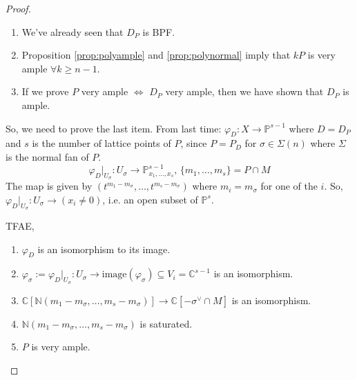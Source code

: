 \documentclass[a4paper,12pt]{amsart}
\begin{document}
\begin{proof}
\begin{enumerate}
	\item We've already seen that $D_P$ is BPF.
	\item Proposition \ref{prop:polyample} and \ref{prop:polynormal} imply that $kP$ is very ample $\forall k \geq n-1$.
	\item If we prove $P$ very ample $\Leftrightarrow$ $D_P$ very ample, then we have shown that $D_P$ is ample. 
\end{enumerate}
So, we need to prove the last item. From last time: $\varphi_D: X \rightarrow \mathbb{P}^{s-1}$ where $D = D_P$ and $s$ is the number of lattice points of $P$, since $P = P_D$ for $\sigma \in \Sigma (n)$ where $\Sigma$ is the normal fan of $P$.
\begin{equation}
	\varphi_D |_{U_\sigma} : U_{\sigma} \rightarrow \mathbb{P}^{s-1}_{x_1,\dotsc,x_s},\,\{m_1,\dotsc,m_s\}=P \cap M
\end{equation}
The map is given by $(t^{m_1 - m_\sigma},\dotsc,t^{m_s-m_\sigma})$ where $m_i = m_\sigma$ for one of the $i$. So, $\varphi_D |_{U_\sigma} :U_{\sigma} \rightarrow (x_i \neq 0)$, i.e. an open subset of $\mathbb{P}^s$.

TFAE,
\begin{enumerate}
	\item $\varphi_D$ is an isomorphism to its image.
	\item $\varphi_\sigma := \varphi_D |_{U_\sigma} :U_{\sigma} \rightarrow \text{image} (\varphi_\sigma) \subseteq V_i= \mathbb{C}^{s-1}$  is an isomorphism.
	\item $\mathbb{C}[\mathbb{N}(m_1 - m_\sigma, \dotsc, m_s-m_\sigma)] \rightarrow \mathbb{C}[-\sigma^{\vee}\cap M]$ is an isomorphism.
	\item $\mathbb{N}(m_1 - m_\sigma, \dotsc, m_s-m_\sigma)$ is saturated.
	\item $P$ is very ample.
\end{enumerate}
\end{proof}
\end{document}
